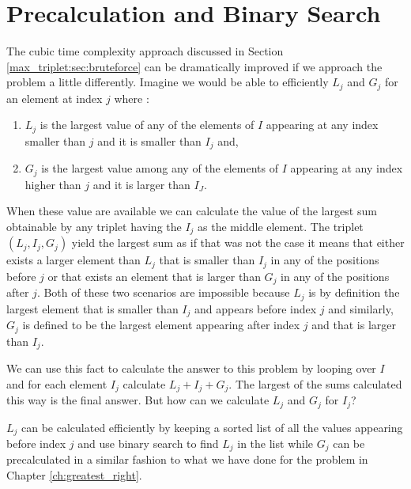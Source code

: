 \section{Precalculation and Binary Search}
The cubic time complexity approach discussed in Section \ref{max_triplet:sec:bruteforce}
can be dramatically improved if we approach the problem a little differently. 
Imagine we would be able to efficiently $L_j$ and $G_j$ for an element at index $j$ where :
\begin{enumerate}
	\item $L_j$ is the largest value of any of the elements of $I$ appearing at any index smaller than $j$ and it is smaller than $I_j$ and,
	\item $G_j$ is the largest value among any of the elements of $I$ appearing at any index higher than $j$ and it is larger than $I_J$.
\end{enumerate}
When these value are available we can calculate the value of the largest sum obtainable by any triplet having the $I_j$  as the middle element.
The triplet $(L_j, I_j, G_j)$ yield the largest sum as if that was not the case it means that either exists a larger element than $L_j$ that is smaller than $I_j$ in any of the positions before $j$
or that exists an element that is larger than $G_j$  in any of the positions after $j$. Both of these two scenarios are impossible  because $L_j$ is by definition the largest element 
that is smaller than $I_j$ and appears before index $j$  and similarly,  $G_j$ is defined to be the largest element appearing after index $j$ and that is larger than $I_j$.

We can use this fact to calculate the answer to this problem by looping over $I$ and for each element $I_j$ calculate $L_j+ I_j+ G_j$. The largest of the sums calculated this way is the final answer.
But how can we calculate $L_j$ and $G_j$ for $I_j$?

$L_j$ can be calculated efficiently by keeping a sorted list of all the values appearing before index $j$ and use binary search to find $L_j$ in the list while $G_j$ can be precalculated
in a similar fashion to what we have done for the problem in Chapter \ref{ch:greatest_right}.

